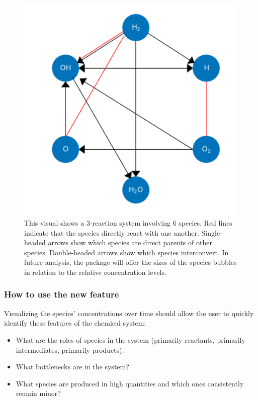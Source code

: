 \documentclass[12pt]{article}
\begin{document}
\begin{figure}[h!]
  \caption{This visual shows a 3-reaction system involving 6 species. Red lines indicate that the species directly react with one another. Single-headed arrows show which species are direct parents of other species. Double-headed arrows show which species interconvert. In future analysis, the package will offer the sizes of the species bubbles in relation to the relative concentration levels. }
  \centering
  \includegraphics[width=\textwidth]{22.png}
\end{figure}

\newpage


\subsubsection{How to use the new feature}
Visualizing the species’ concentrations over time should allow the user to quickly identify these features of the chemical system:

\begin{itemize}

\item What are the roles of species in the system (primarily reactants, primarily intermediates, primarily products).
\item What bottlenecks are in the system?
\item What species are produced in high quantities and which ones consistently remain minor?

\end{itemize}
\end{document}
